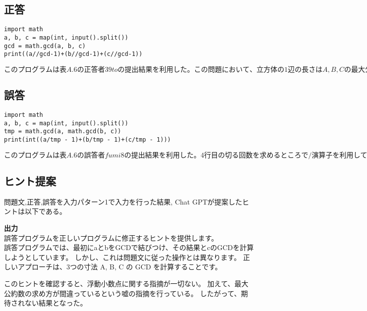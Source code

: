 \subsection{正答}
\begin{lstlisting}
import math
a, b, c = map(int, input().split())   
gcd = math.gcd(a, b, c)   
print((a//gcd-1)+(b//gcd-1)+(c//gcd-1))
\end{lstlisting}
\begin{math}
このプログラムは表A.6の正答者39toの提出結果を利用した。
この問題において、立方体の1辺の長さはA,B,Cの最大公約数となる。
この操作は3行目で行われている。
そして、4行目のように各辺を最大公約数で割ることにより
切る回数を求めることで正解を得られる。
\end{math}

\subsection{誤答}
\begin{lstlisting}
import math
a, b, c = map(int, input().split())
tmp = math.gcd(a, math.gcd(b, c))
print(int((a/tmp - 1)+(b/tmp - 1)+(c/tmp - 1)))
\end{lstlisting}
\begin{math}
このプログラムは表A.6の誤答者fumi8の提出結果を利用した。
4行目の切る回数を求めるところで/演算子を利用している。
この演算子では浮動小数点を扱うため、値が大きくなるほど誤差が生じてしまうという誤りである。
\end{math}

\subsection{ヒント提案}
問題文,正答,誤答を入力パターン1で入力を行った結果,
Chat GPTが提案したヒントは以下である。
\begin{screen}
\textbf{出力}\\
誤答プログラムを正しいプログラムに修正するヒントを提供します。\\
    
誤答プログラムでは、最初にaとbをGCDで結びつけ、その結果とcのGCDを計算しようとしています。
しかし、これは問題文に従った操作とは異なります。
正しいアプローチは、3つの寸法 A, B, C の GCD を計算することです。
\end{screen}
このヒントを確認すると、浮動小数点に関する指摘が一切ない。
加えて、最大公約数の求め方が間違っているという嘘の指摘を行っている。
したがって、期待されない結果となった。